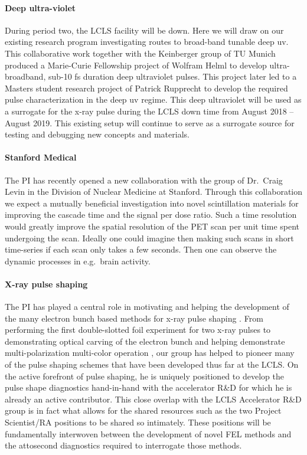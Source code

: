 \paragraph*{Deep ultra-violet}
During period two, the LCLS facility will be down.
Here we will draw on our existing research program investigating routes to broad-band tunable deep uv.
This collaborative work together with the Keinberger group of TU Munich produced a Marie-Curie Fellowship project of Wolfram Helml to develop ultra-broadband, sub-10 fs duration deep ultraviolet pulses.
This project later led to a Masters student research project of Patrick Rupprecht to develop the required pulse characterization in the deep uv regime.
This deep ultraviolet will be used as a surrogate for the x-ray pulse during the LCLS down time from August 2018 -- August 2019.
This existing setup will continue to serve as a surrogate source for testing and debugging new concepts and materials. 

\paragraph*{Stanford Medical}
The PI has recently opened a new collaboration with the group of Dr.~Craig Levin in the Division of Nuclear Medicine at Stanford.
Through this collaboration we expect a mutually beneficial investigation into novel scintillation materials for improving the cascade time and the signal per dose ratio.
Such a time resolution would greatly improve the spatial resolution of the PET scan per unit time spent undergoing the scan. 
Ideally one could imagine then making such scans in short time-series if each scan only takes a few seconds.
Then one can observe the dynamic processes in e.g.~brain activity.

\paragraph*{X-ray pulse shaping}
The PI has played a central role in motivating and helping the development of the many electron bunch based methods for x-ray pulse shaping \cite{Lutman13_twocolor,Marinelli13_twocolor,Helml2014,Marinelli2015,Lutman2016,Marinelli2016}.
From performing the first double-slotted foil experiment for two x-ray pulses \cite{CoffeeDAMOP11} to demonstrating optical carving of the electron bunch \cite{Marinelli2016} and helping demonstrate multi-polarization multi-color operation \cite{Lutman2016}, our group has helped to pioneer many of the pulse shaping schemes that have been developed thus far at the LCLS.
On the active forefront of pulse shaping, he is uniquely positioned to develop the pulse shape diagnostics hand-in-hand with the accelerator R\&D for which he is already an active contributor.
This close overlap with the LCLS Accelerator R\&D group is in fact what allows for the shared resources such as the two Project Scientist/RA positions to be shared so intimately.
These positions will be fundamentally interwoven between the development of novel FEL methods and the attosecond diagnostics required to interrogate those methods.


